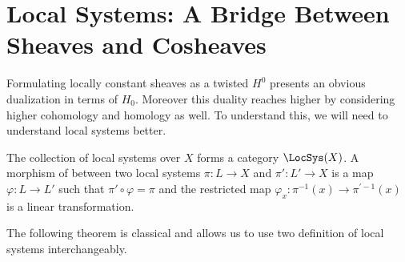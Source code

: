 \section{Local Systems: A Bridge Between Sheaves and Cosheaves}
\label{subsec:local_systems}

Formulating locally constant sheaves as a twisted $H^0$ presents an obvious dualization in terms of $H_0$. Moreover this duality reaches higher by considering higher cohomology and homology as well. To understand this, we will need to understand local systems better. 

\begin{defn}
The collection of local systems over $X$ forms a category $\LocSys(X)$. A morphism of between two local systems $\pi:L\to X$ and $\pi':L'\to X$ is a map $\varphi:L\to L'$ such that $\pi'\circ \varphi =\pi$ and the restricted map $\varphi_x:\pi^{-1}(x)\to \pi^{'-1}(x)$ is a linear transformation.
\end{defn}

The following theorem is classical and allows us to use two definition of local systems interchangeably.

